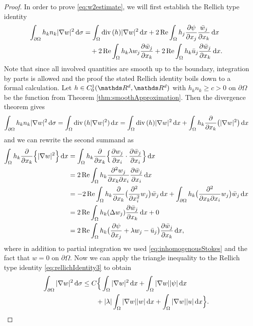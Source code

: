\begin{proof}
  In order to prove \eqref{eq:w2estimate}, we will first establish the Rellich type identity
  \begin{align}
    \int_{\partial\Omega} h_k n_k |\nabla w|^2 \, {\operatorname{d}\!{\sigma}}
    &= \int_\Omega \mathrm{div\,} (h) |\nabla w|^2 \, {\operatorname{d}\!{x}} + 2 \operatorname{Re} \int_{\Omega} h_j \frac{\partial \psi}{\partial x_j} \frac{\bar w_j}{\partial x_k}\, {\operatorname{d}\!{x}}  \nonumber \\
    &\quad + 2 \operatorname{Re} \int_\Omega h_k \lambda w_j \frac{\partial\bar w_j}{\partial x_k} + 2 \operatorname{Re} \int_\Omega h_k \bar u_j \frac{\partial \bar w_j}{\partial x_k} \, {\operatorname{d}\!{x}}. \label{eq:rellichIdentity3}
  \end{align} 
  Note that since all involved quantities are smooth up to the boundary, integration by parts is allowed and the proof the stated  Rellich identity boils down to a formal calculation.
  Let $h \in C_0^1(\R^d, \R^d)$ with $h_k n_k \geq c > 0$ on $\partial \Omega$ be the function from Theorem \ref{thm:smoothApproximation}.
  Then the divergence theorem gives
  \begin{align*}
    \int_{\partial\Omega} h_k n_k |\nabla w|^2 \, {\operatorname{d}\!{\sigma}}
    = \int_{\Omega} \mathrm{div\,} (h |\nabla w|^2) \, {\operatorname{d}\!{x}} = \int_\Omega \mathrm{div\,} (h) |\nabla w|^2 \, {\operatorname{d}\!{x}} + \int_\Omega h_k \frac{\partial}{\partial x_k} \big( |\nabla w|^2 \big) \, {\operatorname{d}\!{x}}
  \end{align*}
  and we can rewrite the second summand as
  \begin{align*}
    \int_{\Omega} h_k \frac{\partial}{\partial x_k} \Big\{ |\nabla w|^2 \Big\} \, {\operatorname{d}\!{x}}
    &= \int_{\Omega} h_k \frac{\partial}{\partial x_k} \Big\{ \frac{\partial w_j}{\partial x_i} \cdot \frac{\partial \bar w_j}{\partial x_i}\Big\} \, {\operatorname{d}\!{x}} \\
    &= 2 \operatorname{Re} \int_\Omega h_k \frac{\partial^2 w_j}{\partial x_k \partial x_i} \frac{\partial \bar w_j}{\partial x_i} \, {\operatorname{d}\!{x}} \\
    &= - 2 \operatorname{Re} \int_\Omega h_k \frac{\partial}{\partial x_k} \big( \frac{\partial^2}{\partial x_i^2} w_j \big) \bar w_j \, {\operatorname{d}\!{x}} + \int_{\partial\Omega} h_k \big( \frac{\partial^2}{\partial x_k \partial x_i} w_j \big) \bar w_j \, {\operatorname{d}\!{x}}\\
    &= 2 \operatorname{Re} \int_\Omega h_k ( \Delta w_j ) \frac{\partial \bar w_j}{\partial x_k} \, {\operatorname{d}\!{x}} + 0 \\
    &= 2 \operatorname{Re} \int_\Omega h_k \big( \frac{\partial \psi}{\partial x_j} + \lambda w_j - \bar u_j \big) \frac{\partial \bar w_j}{\partial x_k} \, {\operatorname{d}\!{x}},
  \end{align*}
  where in addition to partial integration we used \eqref{eq:inhomogenousStokes} and the fact that $w = 0$ on $\partial\Omega$.
  Now we can apply the triangle inequality to the Rellich type identity \eqref{eq:rellichIdentity3} to obtain
  \begin{align}
    \int_{\partial\Omega} |\nabla w|^2 \, {\operatorname{d}\!{\sigma}} 
    &\leq C \Big\{ \int_\Omega |\nabla w|^2 \, {\operatorname{d}\!{x}} + \int_\Omega |\nabla w | |\psi| \, {\operatorname{d}\!{x}} \nonumber\\
    &\qquad + |\lambda| \int_\Omega |\nabla w| |w| \, {\operatorname{d}\!{x}} + \int_\Omega |\nabla w| |u| \, {\operatorname{d}\!{x}} \Big\}. \label{eq:rellichInequality3}
  \end{align}


\end{proof}
